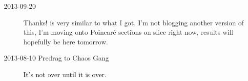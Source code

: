 \begin{description}
\item[2013-09-20] Thanks!  is very similar to what I got, I'm not 
blogging another version of this, I'm moving onto Poincar\'e sections on slice right now, results will hopefully 
be here tomorrow.

\item[2013-08-10  Predrag to Chaos Gang] It's not over until it is over.
\end{description}
